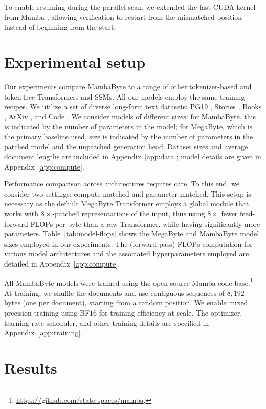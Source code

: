 To enable resuming during the parallel scan, we extended the fast CUDA kernel from Mamba \citep{gu2023mamba}, allowing verification to restart from the mismatched position instead of beginning from the start.

\section{Experimental setup}
\label{sec:setup}

Our experiments compare MambaByte to a range of other tokenizer-based and token-free Transformers and SSMs. All our models employ the same training recipes. We utilize a set of diverse long-form text datasets: PG19 \citep{rae2020compressive}, Stories \citep{trinh2018simple}, Books \citep{gao2020pile}, ArXiv \citep{gao2020pile}, and Code \citep{gao2020pile}. We consider models of different sizes: for MambaByte, this is indicated by the number of parameters in the model; for MegaByte, which is the primary baseline used, size is indicated by the number of parameters in the patched model and the unpatched generation head. Dataset sizes and average document lengths are included in Appendix~\ref{app:data}; model details are given in  Appendix~\ref{app:compute}.

Performance comparison across architectures requires care. To this end, we consider two settings: compute-matched and parameter-matched. This setup is necessary as the default MegaByte Transformer employs a global module that works with $8\times$-patched representations of the input, thus using $8\times$ fewer feed-forward FLOPs per byte than a raw Transformer, while having significantly more parameters. Table~\ref{tab:model-flops} shows the MegaByte and MambaByte model sizes employed in our experiments. The (forward pass) FLOPs computation for various model architectures and the associated hyperparameters employed are detailed in Appendix~\ref{app:compute}.

All MambaByte models were trained using the open-source Mamba code base.\footnote{\url{https://github.com/state-spaces/mamba}.} At training, we shuffle the documents and use contiguous sequences of $8,192$ bytes (one per document), starting from a random position. We enable mixed precision training using BF$16$ for training efficiency at scale. The optimizer, learning rate scheduler, and other training details are specified in Appendix~\ref{app:training}. 

\section{Results}
\label{sec:results}

